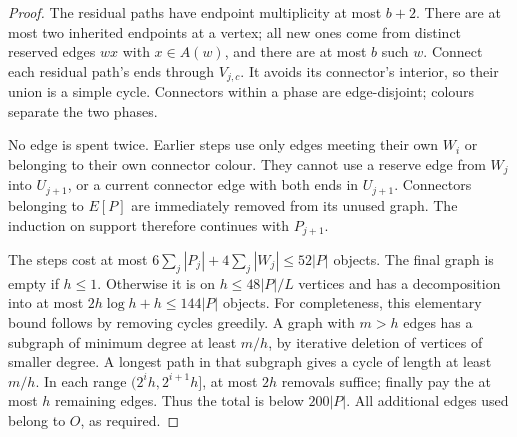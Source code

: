 \documentclass[11pt]{article}
\theoremstyle{remark}\newtheorem*{remark}{Remark}
\begin{document}
\begin{proof}
The residual paths have endpoint multiplicity at most $b+2$.
There are at most two inherited endpoints at a vertex; all new ones
come from distinct reserved edges $wx$ with $x\in A(w)$, and there
are at most $b$ such $w$. Connect each residual path's ends through
$V_{j,c}$. It avoids its connector's interior, so their union is a
simple cycle. Connectors within a phase are edge-disjoint; colours
separate the two phases.

No edge is spent twice. Earlier steps use only edges meeting their own
$W_i$ or belonging to their own connector colour. They cannot use a
reserve edge from $W_j$ into $U_{j+1}$, or a current connector edge with
both ends in $U_{j+1}$. Connectors belonging to $E[P]$ are immediately
removed from its unused graph. The induction on support therefore
continues with $P_{j+1}$.

The steps cost at most $6\sum_j|P_j|+4\sum_j|W_j|\le52|P|$ objects.
The final graph is empty if $h\le1$. Otherwise it is on
$h\le48|P|/L$ vertices and has a decomposition
into at most $2h\log h+h\le144|P|$ objects.
For completeness, this elementary bound follows by removing cycles
greedily. A graph with $m>h$ edges has a subgraph of minimum degree
at least $m/h$, by iterative deletion of vertices of smaller degree.
A longest path in that subgraph gives a cycle of length at least $m/h$.
In each range $(2^ih,2^{i+1}h]$, at most $2h$ removals suffice; finally
pay the at most $h$ remaining edges. Thus the total is below $200|P|$.
All additional edges used belong to $O$, as required.
\end{proof}
\end{document}

